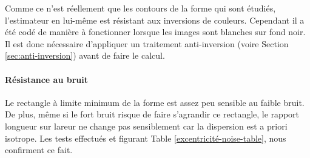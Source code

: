 \documentclass{article}
\theoremstyle{definition}
\begin{document}
	  Comme ce n'est réellement que les contours de la forme qui sont étudiés, l'estimateur en lui-même est résistant aux inversions de couleurs. Cependant il a été codé de manière à fonctionner lorsque les images sont blanches sur fond noir. Il est donc nécessaire d'appliquer un traitement anti-inversion (voire Section \ref{sec:anti-inversion}) avant de faire le calcul.
	
	\paragraph{Résistance au bruit}
	
	  Le rectangle à limite minimum de la forme est assez peu sensible au faible bruit. De plus, même si le fort bruit risque de faire s'agrandir ce rectangle, le rapport longueur sur lareur ne change pas sensiblement car la dispersion est a priori isotrope. Les tests effectués et figurant Table \ref{excentricité-noise-table}, nous confirment ce fait. \\
	
\end{document}
